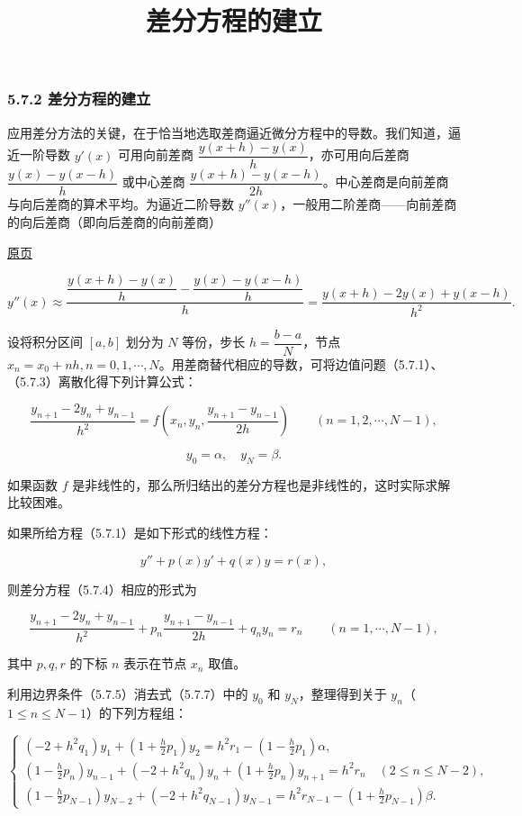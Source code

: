 \documentclass[
  10pt,
  fontset=fandol]{ctexart}
\title{差分方程的建立}
\author{}
\date{}
\begin{document}
\maketitle

\subsubsection{5.7.2 差分方程的建立}\label{ux5deeux5206ux65b9ux7a0bux7684ux5efaux7acb}

应用差分方法的关键，在于恰当地选取差商逼近微分方程中的导数。我们知道，逼近一阶导数 \(y'(x)\) 可用向前差商 \(\dfrac{y(x+h)-y(x)}h\)，亦可用向后差商 \(\dfrac{y(x)-y(x-h)}h\) 或中心差商 \(\dfrac{y(x+h)-y(x-h)}{2h}\)。中心差商是向前差商与向后差商的算术平均。为逼近二阶导数 \(y''(x)\)，一般用二阶差商------向前差商的向后差商（即向后差商的向前差商）

\href{../../source-images/pdf-149.jpeg}{原页}

\[
y''(x)\approx\frac{\dfrac{y(x+h)-y(x)}h-\dfrac{y(x)-y(x-h)}h}{h}
=\frac{y(x+h)-2y(x)+y(x-h)}{h^2}.
\]

设将积分区间 \([a,b]\) 划分为 \(N\) 等份，步长 \(h=\dfrac{b-a}{N}\)，节点 \(x_n=x_0+nh,n=0,1,\cdots,N\)。用差商替代相应的导数，可将边值问题（5.7.1）、（5.7.3）离散化得下列计算公式：

\[
\frac{y_{n+1}-2y_n+y_{n-1}}{h^2}=f\left(x_n,y_n,\frac{y_{n+1}-y_{n-1}}{2h}\right)\qquad(n=1,2,\cdots,N-1),
\tag{5.7.4}
\]

\[
y_0=\alpha,\quad y_N=\beta.
\tag{5.7.5}
\]

如果函数 \(f\) 是非线性的，那么所归结出的差分方程也是非线性的，这时实际求解比较困难。

如果所给方程（5.7.1）是如下形式的线性方程：

\[
y''+p(x)y'+q(x)y=r(x),
\tag{5.7.6}
\]

则差分方程（5.7.4）相应的形式为

\[
\frac{y_{n+1}-2y_n+y_{n-1}}{h^2}+p_n\frac{y_{n+1}-y_{n-1}}{2h}+q_ny_n=r_n\qquad(n=1,\cdots,N-1),
\tag{5.7.7}
\]

其中 \(p,q,r\) 的下标 \(n\) 表示在节点 \(x_n\) 取值。

利用边界条件（5.7.5）消去式（5.7.7）中的 \(y_0\) 和 \(y_N\)，整理得到关于 \(y_n\)（\(1\le n\le N-1\)）的下列方程组：

\[
\begin{cases}
\displaystyle(-2+h^2q_1)y_1+\left(1+\frac h2p_1\right)y_2=h^2r_1-\left(1-\frac h2p_1\right)\alpha,\\[6pt]
\displaystyle\left(1-\frac h2p_n\right)y_{n-1}+(-2+h^2q_n)y_n+\left(1+\frac h2p_n\right)y_{n+1}=h^2r_n\quad(2\le n\le N-2),\\[6pt]
\displaystyle\left(1-\frac h2p_{N-1}\right)y_{N-2}+(-2+h^2q_{N-1})y_{N-1}=h^2r_{N-1}-\left(1+\frac h2p_{N-1}\right)\beta.
\end{cases}
\tag{5.7.8}
\]
\end{document}

